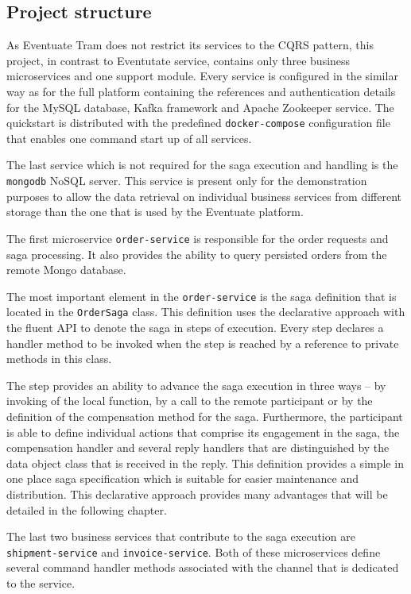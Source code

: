 \documentclass[oneside,
  digital, %
  table,   %
  nolof,     %
  nolot,     %
]{fithesis3}
\begin{document}
\subsection{Project structure}

As Eventuate Tram does not restrict its services to the CQRS pattern, this project, in contrast to Eventutate service, contains only three business microservices and one support module. Every service is configured in the similar way as for the full platform containing the references and authentication details for the MySQL database, Kafka framework and Apache Zookeeper service. The quickstart is distributed with the predefined \texttt{docker-compose} configuration file that enables one command start up of all services.

The last service which is not required for the saga execution and handling is the \texttt{mongodb} NoSQL server. This service is present only for the demonstration purposes to allow the data retrieval on individual business services from different storage than the one that is used by the Eventuate platform.

The first microservice \texttt{order-service} is responsible for the order requests and saga processing. It also provides the ability to query persisted orders from the remote Mongo database.

The most important element in the \texttt{order-service} is the saga definition that is located in the \texttt{OrderSaga} class. This definition uses the declarative approach with the fluent API to denote the saga in steps of execution. Every step declares a handler method to be invoked when the step is reached by a reference to private methods in this class.

The step provides an ability to advance the saga execution in three ways -- by invoking of the local function, by a call to the remote participant or by the definition of the compensation method for the saga. Furthermore, the participant is able to define individual actions that comprise its engagement in the saga, the compensation handler and several reply handlers that are distinguished by the data object class that is received in the reply. This definition provides a simple in one place saga specification which is suitable for easier maintenance and distribution. This declarative approach provides many advantages that will be detailed in the following chapter.

The last two business services that contribute to the saga execution are \texttt{shipment-service} and \texttt{invoice-service}. Both of these microservices define several command handler methods associated with the channel that is dedicated to the service. 
\end{document}
